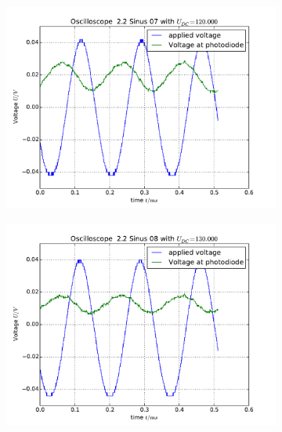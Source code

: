 \begin{figure}
    \begin{subfigure}[b]{\picwidth}
        \includegraphics[width=\textwidth]{analysis/figures/22sinus07}
        \caption{}
    \end{subfigure}\qquad
    \begin{subfigure}[b]{\picwidth}
        \includegraphics[width=\textwidth]{analysis/figures/22sinus08}
        \caption{}
    \end{subfigure}
    \begin{subfigure}[b]{\picwidth}

\end{subfigure}
\end{figure}
